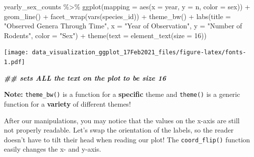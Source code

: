 \documentclass[
]{article}
\newenvironment{Shaded}{\begin{snugshade}}{\end{snugshade}}
\newcommand{\AttributeTok}[1]{\textcolor[rgb]{0.77,0.63,0.00}{#1}}
\newcommand{\DecValTok}[1]{\textcolor[rgb]{0.00,0.00,0.81}{#1}}
\newcommand{\DocumentationTok}[1]{\textcolor[rgb]{0.56,0.35,0.01}{\textbf{\textit{#1}}}}
\newcommand{\FunctionTok}[1]{\textcolor[rgb]{0.00,0.00,0.00}{#1}}
\newcommand{\NormalTok}[1]{#1}
\newcommand{\SpecialCharTok}[1]{\textcolor[rgb]{0.00,0.00,0.00}{#1}}
\newcommand{\StringTok}[1]{\textcolor[rgb]{0.31,0.60,0.02}{#1}}
\begin{document}
\begin{Shaded}
\begin{Highlighting}[]
\NormalTok{yearly\_sex\_counts }\SpecialCharTok{\%\textgreater{}\%} 
  \FunctionTok{ggplot}\NormalTok{(}\AttributeTok{mapping =} \FunctionTok{aes}\NormalTok{(}\AttributeTok{x =}\NormalTok{ year, }\AttributeTok{y =}\NormalTok{ n, }\AttributeTok{color =}\NormalTok{ sex)) }\SpecialCharTok{+}
  \FunctionTok{geom\_line}\NormalTok{() }\SpecialCharTok{+}
  \FunctionTok{facet\_wrap}\NormalTok{(}\FunctionTok{vars}\NormalTok{(species\_id)) }\SpecialCharTok{+}
  \FunctionTok{theme\_bw}\NormalTok{() }\SpecialCharTok{+}
  \FunctionTok{labs}\NormalTok{(}\AttributeTok{title =} \StringTok{"Observed Genera Through Time"}\NormalTok{,}
       \AttributeTok{x =} \StringTok{"Year of Observation"}\NormalTok{,}
       \AttributeTok{y =} \StringTok{"Number of Rodents"}\NormalTok{, }
       \AttributeTok{color =} \StringTok{"Sex"}\NormalTok{) }\SpecialCharTok{+}
  \FunctionTok{theme}\NormalTok{(}\AttributeTok{text =} \FunctionTok{element\_text}\NormalTok{(}\AttributeTok{size =} \DecValTok{16}\NormalTok{))}
\end{Highlighting}
\end{Shaded}

\texttt{[image: data\_visualization\_ggplot\_17Feb2021\_files/figure-latex/fonts-1.pdf]}

\begin{Shaded}
\begin{Highlighting}[]
\DocumentationTok{\#\# sets ALL the text on the plot to be size 16}
\end{Highlighting}
\end{Shaded}

\textbf{Note:} \texttt{theme\_bw()} is a function for a
\textbf{specific} theme and \texttt{theme()} is a generic function for a
\textbf{variety} of different themes!

After our manipulations, you may notice that the values on the x-axis
are still not properly readable. Let's swap the orientation of the
labels, so the reader doesn't have to tilt their head when reading our
plot! The \texttt{coord\_flip()} function easily changes the x- and
y-axis.
\end{document}
